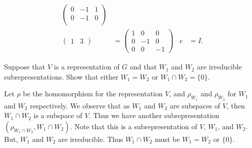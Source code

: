\begin{questions}
\begin{parts}
\begin{solution}
\begin{align*}
\begin{pmatrix}
          0 & -1 & 1 \\
          0 & -1 & 0 \\
        \end{pmatrix}
        \\
        \begin{pmatrix}
          1 & 3
        \end{pmatrix}
          & =
        \begin{pmatrix}
          1 & 0  & 0  \\
          0 & -1 & 0  \\
          0 & 0  & -1
        \end{pmatrix}
          &
        e & = I.
      \end{align*}
    \end{solution}
  \end{parts}

  \question Suppose that $V$ is a representation of $G$ and that $W_1$ and $W_2$ are irreducible subrepresentations. Show that either $W_1 = W_2$ or $W_1 \cap W_2 = \{0\}$.
  \begin{solution}
    Let $\rho$ be the homomorphism for the representation $V$, and $\rho_{W_1}$ and $\rho_{W_2}$ for $W_1$ and $W_2$ respectively.
    We observe that as $W_1$ and $W_2$ are subspaces of $V$, then $W_1 \cap W_2$ is a subspace of $V$. Thus we have another subrepresentation $(\rho_{W_1 \cap W_2}, W_1 \cap W_2)$. Note that this is a subrepresentation of $V$, $W_1$, and $W_2$. But, $W_1$ and $W_2$ are irreducible.
    Thus $W_1 \cap W_2$ must be $W_1 = W_2$ or $\{0\}$.
  \end{solution}


\end{questions}
